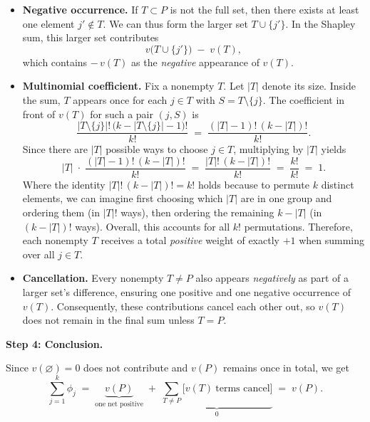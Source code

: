 {\begin{enumerate}
\begin{proofsketch}
\begin{itemize}
    \item \textbf{Negative occurrence.} 
    If \(T \subset P\) is not the full set, then there exists at least one element \(j' \notin T\). We can thus form the larger set \(T \cup \{j'\}\). In the Shapley sum, this larger set contributes
    \[
      v\bigl(T \cup \{j'\}\bigr) \;-\; v(T),
    \]
    which contains \(-\,v(T)\) as the \emph{negative} appearance of \(v(T)\).

    \item \textbf{Multinomial coefficient.} 
    Fix a nonempty $T$. Let $|T|$ denote its size. Inside the sum, $T$ appears once for each $j \in T$ with $S = T \setminus \{j\}$. The coefficient in front of $v(T)$ for such a pair $(j,S)$ is
    \[
      \frac{|T\setminus\{j\}|!\,\bigl(k - |T\setminus\{j\}| -1\bigr)!}{k!}
      \;=\;
      \frac{(|T|-1)!\,(k - |T|)!}{k!}.
    \]
    Since there are $|T|$ possible ways to choose $j\in T$, multiplying by $|T|$ yields
    \[
      |T| 
      \;\cdot\; 
      \frac{(|T|-1)!\,(k - |T|)!}{k!}
      \;=\;
      \frac{|T|!\,(k - |T|)!}{k!}
      \;=\;
      \frac{k!}{k!}
      \;=\;
      1.
    \]
    Where the identity $|T|!\,(k - |T|)! = k!$ holds because to permute $k$ distinct elements, 
we can imagine first choosing which $|T|$ are in one group and ordering them 
(in $|T|!$ ways), then ordering the remaining $k - |T|$ (in $(k - |T|)!$ ways). 
Overall, this accounts for all $k!$ permutations. 
    Therefore, each nonempty $T$ receives a total \emph{positive} weight of exactly $+1$ when summing over all $j \in T$.

    \item \textbf{Cancellation.} 
    Every nonempty \(T \neq P\) also appears \emph{negatively} as part of a larger set’s difference, ensuring one positive and one negative occurrence of $v(T)$. Consequently, these contributions cancel each other out, so \(v(T)\) does not remain in the final sum unless $T=P$.
\end{itemize}
\medskip
\noindent
\textbf{Step 4: Conclusion.}

Since $v(\varnothing) = 0$ does not contribute and $v(P)$ remains once in total, we get
\[
\sum_{j=1}^k \phi_j 
\;=\;
\underbrace{v(P)}_{\text{one net positive}} 
\;+\; 
\underbrace{\sum_{T \neq P} \bigl[v(T)\ \text{terms cancel}\bigr]}_{0} 
\;=\;
v(P).
\]
\qedhere
\end{proofsketch}



\end{enumerate}}
